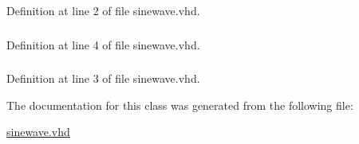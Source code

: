 Definition at line 2 of file sinewave.\+vhd.

\hypertarget{classsinewave_ae00f3f04545af57582ff10609eee23e2}{}
\subsubsection[{N\+U\+M\+E\+R\+I\+C\+\_\+\+S\+T\+D}]{\hspace{0.3cm}{\ttfamily [Package]}}\label{classsinewave_ae00f3f04545af57582ff10609eee23e2}


Definition at line 4 of file sinewave.\+vhd.

\hypertarget{classsinewave_aa4b2b25246a821511120e3149b003563}{}
\subsubsection[{S\+T\+D\+\_\+\+L\+O\+G\+I\+C\+\_\+1164}]{\hspace{0.3cm}{\ttfamily [Package]}}\label{classsinewave_aa4b2b25246a821511120e3149b003563}


Definition at line 3 of file sinewave.\+vhd.



The documentation for this class was generated from the following file\+:\begin{DoxyCompactItemize}
\item 
\hyperlink{sinewave_8vhd}{sinewave.\+vhd}\end{DoxyCompactItemize}
